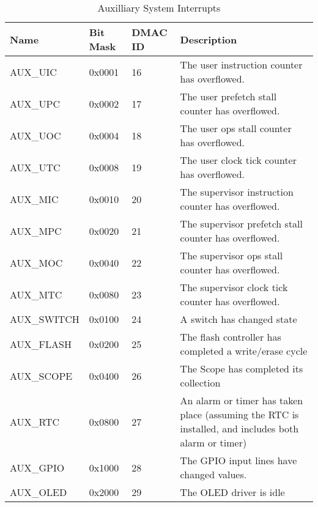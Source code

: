 \documentclass{gqtekspec}
\begin{document}
\begin{table}[htbp]
\begin{center}\begin{tabular}{|p{0.9in}|p{0.75in}|p{0.75in}|p{3.00in}|}\hline
\rowcolor[gray]{0.85} Name & Bit Mask & DMAC ID &Description \\\hline\hline
AUX\_UIC & 0x0001 & 16 & The user instruction counter has overflowed.\\\hline
AUX\_UPC & 0x0002 & 17 & The user prefetch stall counter has overflowed.\\\hline
AUX\_UOC & 0x0004 & 18 & The user ops stall counter has overflowed.\\\hline
AUX\_UTC & 0x0008 & 19 & The user clock tick counter has overflowed.\\\hline
AUX\_MIC & 0x0010 & 20 & The supervisor instruction counter has overflowed.\\\hline
AUX\_MPC & 0x0020 & 21 & The supervisor prefetch stall counter has overflowed.\\\hline
AUX\_MOC & 0x0040 & 22 & The supervisor ops stall counter has overflowed.\\\hline
AUX\_MTC & 0x0080 & 23 & The supervisor clock tick counter has overflowed.\\\hline
AUX\_SWITCH & 0x0100 & 24 & A switch has changed state\\\hline
AUX\_FLASH  & 0x0200 & 25 & The flash controller has completed a write/erase cycle\\\hline
AUX\_SCOPE & 0x0400 & 26 & The Scope has completed its collection\\\hline
AUX\_RTC    & 0x0800 & 27& An alarm or timer has taken place (assuming the RTC
		is installed, and includes both alarm or timer)\\\hline
AUX\_GPIO   & 0x1000 & 28 & The GPIO input lines have changed values.\\\hline
AUX\_OLED   & 0x2000 & 29 & The OLED driver is idle\\\hline
\end{tabular}
\caption{Auxilliary System Interrupts}\label{tbl:aux-ints}
\end{center}\end{table}
\end{document}
